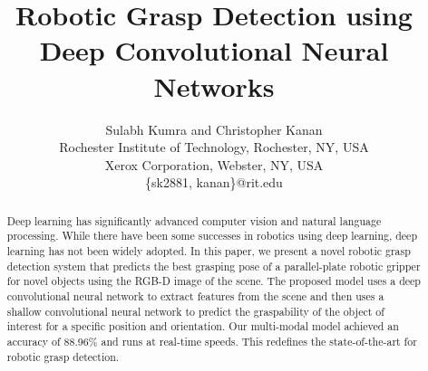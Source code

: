 \documentclass[10pt,twocolumn,letterpaper]{article}
\begin{document}
\title{Robotic Grasp Detection using Deep Convolutional Neural Networks}
\author{Sulabh Kumra and Christopher Kanan
       \\
       Rochester Institute of Technology, Rochester, NY, USA\\
       Xerox Corporation, Webster, NY, USA\\
       \{sk2881, kanan\}@rit.edu\\ 
       }




\maketitle


\begin{abstract}
Deep learning has significantly advanced computer vision and natural language processing. While there have been some successes in robotics using deep learning, deep learning has not been widely adopted. In this paper, we present a novel robotic grasp detection system that predicts the best grasping pose of a parallel-plate robotic gripper for novel objects using the RGB-D image of the scene. The proposed model uses a  deep convolutional neural network to extract features from the scene and then uses a shallow convolutional neural network to predict the graspability of the object of interest for a specific position and orientation. Our multi-modal model achieved an accuracy of 88.96\% and runs at real-time speeds. This redefines the state-of-the-art for robotic grasp detection.




\end{abstract}
\end{document}
